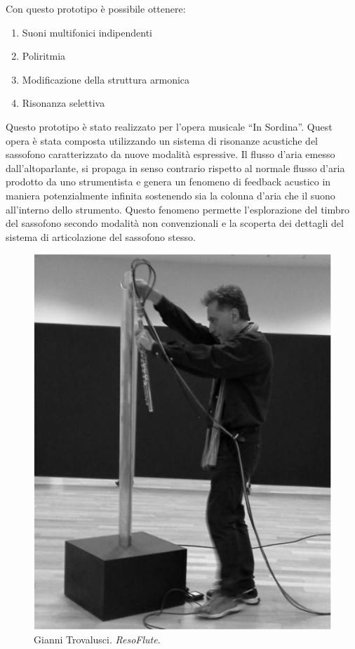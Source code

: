 Con questo prototipo è possibile ottenere:
\begin{enumerate}
  \item Suoni multifonici indipendenti
  \item Poliritmia
  \item Modificazione della struttura armonica
  \item Risonanza selettiva
\end{enumerate}

Questo prototipo è stato realizzato per l’opera musicale “In Sordina”.
Quest opera è stata composta utilizzando un sistema di risonanze acustiche del
sassofono caratterizzato da nuove modalità espressive.
Il flusso d’aria emesso dall’altoparlante, si propaga in senso contrario rispetto
al normale flusso d’aria prodotto da uno strumentista e genera un fenomeno di
feedback acustico in maniera potenzialmente infinita sostenendo sia la colonna
d’aria che il suono all’interno dello strumento.
Questo fenomeno permette l’esplorazione  del timbro del sassofono secondo
modalità non convenzionali e la scoperta dei dettagli del sistema di articolazione
del sassofono stesso.

\begin{figure}%
\centering
\includegraphics[width=0.99\columnwidth]{Graphics/foto/reso}
\caption[]{Gianni Trovalusci. \emph{ResoFlute}.}
\label{windback}
\end{figure}

